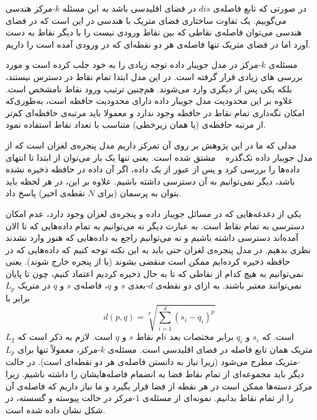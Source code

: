 در صورتی که تابع فاصله‌ی $dis$ در فضای اقلیدسی باشد به این مسئله $k$-مرکز هندسی می‌گوییم. یک تفاوت ساختاری فضای متریک با هندسی در این است که در فضای هندسی می‌توان فاصله‌ی نقاطی که بین نقاط ورودی نیست را با دیگر نقاط به دست آورد اما در فضای متریک تنها فاصله‌ی هر دو نقطه‌ای که در ورودی آمده است را داریم.

مسئله‌ی $k$-مرکز در مدل جویبار داده توجه زیادی را به خود جلب کرده است و مورد بررسی ‌های زیادی قرار گرفته است. در این مدل ابتدا تمام نقاط در دسترس نیستند، بلکه یکی پس از دیگری وارد می‌شوند. هم‌چنین ترتیب ورود نقاط نامشخص است. 
علاوه بر این محدودیت مدل جویبار داده دارای محدودیت حافظه است، به‌طوری‌که امکان نگه‌داری تمام نقاط در حافظه  وجود ندارد و معمولا باید مرتبه‌ی حافظه‌ای کم‌تر از مرتبه حافظه‌ی  (یا همان زیرخطی) متناسب با تعداد نقاط استفاده نمود.

مدلی که ما در این پژوهش بر روی آن تمرکز داریم مدل پنجره‌ی لغزان است که از مدل جویبار داده تک‌گذره ~ مشتق شده‌ است.
یعنی تنها یک بار می‌توان از ابتدا تا انتهای داده‌ها را بررسی کرد و پس از عبور از یک داده، اگر آن داده در حافظه ذخیره نشده باشد، دیگر نمی‌توانیم به آن دسترسی داشته باشیم. علاوه بر این، در هر لحظه باید بتوان به پرسمان (برای $N$ نقطه‌ی اخیر) پاسخ داد.

یکی از دغدغه‌هایی که در مسائل جویبار داده  و پنجره‌ی لغزان وجود دارد، عدم امکان دسترسی به تمام نقاط است.
به عبارت دیگر نه می‌توانیم به تمام داده‌هایی که تا الان آمده‌اند دسترسی داشته باشیم و نه می‌توانیم راجع به داده‌هایی که هنوز وارد نشدند نظری بدهیم. در مدل پنجره‌ی لغزان حتی باید به این نکته توجه کنیم که داده‌هایی که در حافظه ذخیره کرده‌ایم ممکن است منقضی بشوند (یا از پنجره‌ خارج شوند). یعنی نمی‌توانیم به هیچ کدام از نقاطی که تا به حال ذخیره کردیم اعتماد کنیم، چون تا پایان نمی‌توانند معتبر باشند.
به ازای دو نقطه‌ی $d$-بعدی $s$ و $q$، فاصله‌ی $s$ و $q$ در متریک $L_p$ برابر با
$$d(p, q) = \sqrt[p]{\sum_{i=1}^{d} (s_i - q_i) ^ p}$$
است. که $s_i$ و $q_i$ برابر مختصات بعد $i$ام نقاط $s$ و $q$ است. 
لازم به ذکر است که $L_2$ متریک همان تابع فاصله در فضای اقلیدسی است. مسئله‌ی $k$-مرکز، معمولاً تنها برای $L_p$-متریک مطرح می‌شود (زیرا نیاز به دانستن فاصله‌ی هر دو نقطه‌ای است). در حالت دیگر باید مجموعه‌ای از تمام نقاط فضا به انضمام فاصله‌هایشان را داشته باشیم.
زیرا مرکز دسته‌ها ممکن است در هر نقطه از فضا قرار بگیرد و ما نیاز داریم که فاصله‌ی آن را از تمام نقاط بدانیم.
نمونه‌ای از مسئله‌ی $1$-مرکز در حالت پیوسته و گسسته، در شکل  نشان داده شده است.


